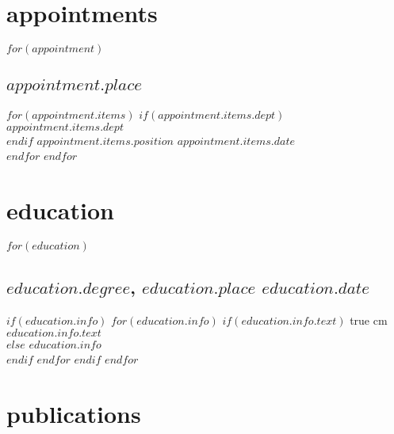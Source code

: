 \documentclass[11pt, letter]{article}
\title{}
\def\ind{\hangindent=1 true cm\hangafter=1 \noindent}
\begin{document}
\maketitle




\section{appointments}
$for(appointment)$
\subsection{$appointment.place$}
\vspace*{-0.2cm}

$for(appointment.items)$
 $if(appointment.items.dept)$
 \footnotesize{$appointment.items.dept$} \normalsize \\
 $endif$
$appointment.items.position$\hspace*{\fill} $appointment.items.date$ \\
$endfor$
$endfor$

\section{education}
$for(education)$
\subsection{$education.degree$, \textnormal{$education.place$ \hspace*{\fill}$education.date$}}

$if(education.info)$
$for(education.info)$
$if(education.info.text)$
\ind \hspace{0.35in} \footnotesize $education.info.text$ \normalsize \\
$else$
$education.info$ \\
$endif$
$endfor$
$endif$
$endfor$

\vspace{0.12in}

\section{publications}
\end{document}
